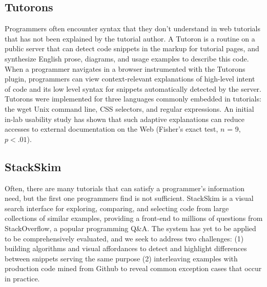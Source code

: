 \documentclass[12pt]{memoir}
\begin{document}
\subsection{Tutorons}
Programmers often encounter syntax that they don't understand in web tutorials that has not been explained by the tutorial author.
A Tutoron is a routine on a public server that can detect code snippets in the markup for tutorial pages, and synthesize English prose, diagrams, and usage examples to describe this code.
When a programmer navigates in a browser instrumented with the Tutorons plugin, programmers can view context-relevant explanations of high-level intent of code and its low level syntax for snippets automatically detected by the server.
Tutorons were implemented for three languages commonly embedded in tutorials: the wget Unix command line, CSS selectors, and regular expressions.
An initial in-lab usability study has shown that such adaptive explanations can reduce accesses to external documentation on the Web (Fisher's exact test, $n$ = 9, $p<.01$).

\subsection{StackSkim}
Often, there are many tutorials that can satisfy a programmer's information need, but the first one programmers find is not sufficient.
StackSkim is a visual search interface for exploring, comparing, and selecting code from large collections of similar examples, providing a front-end to millions of questions from StackOverflow, a popular programming Q\&A.
The system has yet to be applied to be comprehensively evaluated, and we seek to address two challenges:
(1) building algorithms and visual affordances to detect and highlight differences between snippets serving the same purpose
(2) interleaving examples with production code mined from Github to reveal common exception cases that occur in practice.
\end{document}
